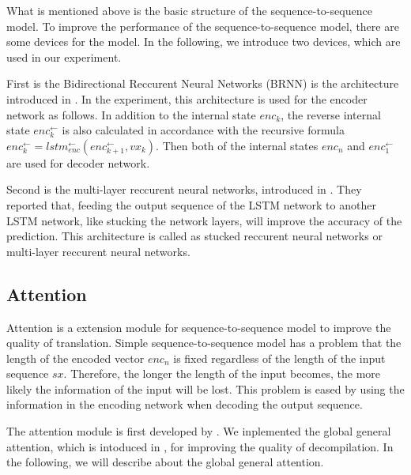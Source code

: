 \documentclass[senior,final,11pt]{iscs-thesis}
\begin{document}


What is mentioned above is the basic structure of the sequence-to-sequence model.
To improve the performance of the sequence-to-sequence model, there are some devices for the model.
In the following, we introduce two devices, which are used in our experiment.

First is the Bidirectional Reccurent Neural Networks (BRNN) is the architecture introduced in \cite{BiRNN}.
In the experiment, this architecture is used for the encoder network as follows.
In addition to the internal state $ enc_{k} $, the reverse internal state $ enc_{k}^{\gets} $ is also calculated 
in accordance with the recursive formula $ enc_{k}^{\gets} = lstm_{enc}^{\gets}(enc_{k+1}^{\gets},vx_{k}) $.
Then both of the internal states $ enc_{n} $ and $ enc_{1}^{\gets} $ are used for decoder network.

Second is the multi-layer reccurent neural networks, introduced in \cite{multi_layer}.
They reported that, feeding the output sequence of the LSTM network to another LSTM network, like stucking the network layers, will improve the accuracy of the prediction.
This architecture is called as stucked reccurent neural networks or multi-layer reccurent neural networks.





\subsection{Attention}
Attention is a extension module for sequence-to-sequence model to improve the quality of translation. 
Simple sequence-to-sequence model has a problem that the length of the encoded vector $enc_{n}$ is fixed 
regardless of the length of the input sequence $sx$. 
Therefore, the longer the length of the input becomes, the more likely the information of the input will be lost.
This problem is eased by using the information in the encoding network when decoding the output sequence.

The attention module is first developed by \cite{attention_paper}.
We inplemented the global general attention, which is intoduced in \cite{dot_attention}, for improving the quality of decompilation.
In the following, we will describe about the global general attention.
\end{document}
